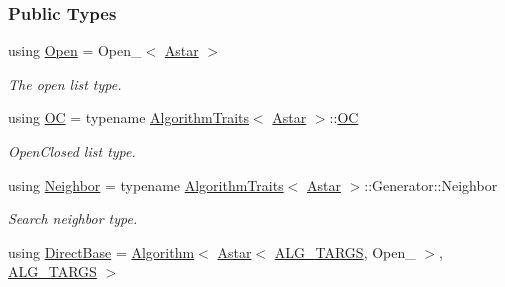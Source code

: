 \subsubsection*{Public Types}
\begin{DoxyCompactItemize}
\item 
using \hyperlink{structslb_1_1ext_1_1algorithm_1_1Astar_a007033a41137be7d62861e1b10c204d9}{Open} = Open\+\_\+$<$ \hyperlink{structslb_1_1ext_1_1algorithm_1_1Astar}{Astar} $>$\hypertarget{structslb_1_1ext_1_1algorithm_1_1Astar_a007033a41137be7d62861e1b10c204d9}{}\label{structslb_1_1ext_1_1algorithm_1_1Astar_a007033a41137be7d62861e1b10c204d9}

\begin{DoxyCompactList}\small\item\em The open list type. \end{DoxyCompactList}\item 
using \hyperlink{structslb_1_1ext_1_1algorithm_1_1Astar_a7c221266394f6833a6f5aadb0f76315d}{OC} = typename \hyperlink{classslb_1_1ext_1_1algorithm_1_1AlgorithmTraits}{Algorithm\+Traits}$<$ \hyperlink{structslb_1_1ext_1_1algorithm_1_1Astar}{Astar} $>$\+::\hyperlink{structslb_1_1ext_1_1algorithm_1_1Astar_a7c221266394f6833a6f5aadb0f76315d}{OC}\hypertarget{structslb_1_1ext_1_1algorithm_1_1Astar_a7c221266394f6833a6f5aadb0f76315d}{}\label{structslb_1_1ext_1_1algorithm_1_1Astar_a7c221266394f6833a6f5aadb0f76315d}

\begin{DoxyCompactList}\small\item\em Open\+Closed list type. \end{DoxyCompactList}\item 
using \hyperlink{structslb_1_1ext_1_1algorithm_1_1Astar_a1c38f30602110360ceb99e12b055432f}{Neighbor} = typename \hyperlink{classslb_1_1ext_1_1algorithm_1_1AlgorithmTraits}{Algorithm\+Traits}$<$ \hyperlink{structslb_1_1ext_1_1algorithm_1_1Astar}{Astar} $>$\+::Generator\+::\+Neighbor\hypertarget{structslb_1_1ext_1_1algorithm_1_1Astar_a1c38f30602110360ceb99e12b055432f}{}\label{structslb_1_1ext_1_1algorithm_1_1Astar_a1c38f30602110360ceb99e12b055432f}

\begin{DoxyCompactList}\small\item\em Search neighbor type. \end{DoxyCompactList}\item 
using \hyperlink{structslb_1_1ext_1_1algorithm_1_1Astar_ae3dc41bb8fd97c3669db3704b24f2a1f}{Direct\+Base} = \hyperlink{structslb_1_1ext_1_1algorithm_1_1Algorithm}{Algorithm}$<$ \hyperlink{structslb_1_1ext_1_1algorithm_1_1Astar}{Astar}$<$ \hyperlink{algorithm_8h_a425b5a86fe8dae889a8343e14267c3c0}{A\+L\+G\+\_\+\+T\+A\+R\+GS}, Open\+\_\+ $>$, \hyperlink{algorithm_8h_a425b5a86fe8dae889a8343e14267c3c0}{A\+L\+G\+\_\+\+T\+A\+R\+GS} $>$\hypertarget{structslb_1_1ext_1_1algorithm_1_1Astar_ae3dc41bb8fd97c3669db3704b24f2a1f}{}\label{structslb_1_1ext_1_1algorithm_1_1Astar_ae3dc41bb8fd97c3669db3704b24f2a1f}


\end{DoxyCompactItemize}
